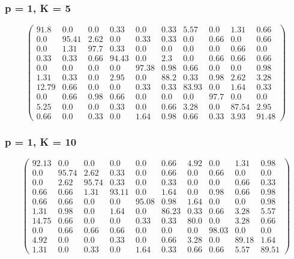 \begin{appendices}
\subsubsection*{p = 1, K = 5}
$$\begin{pmatrix}
91.8&0.0&0.0&0.33&0.0&0.33&5.57&0.0&1.31&0.66\\
0.0&95.41&2.62&0.0&0.33&0.33&0.0&0.66&0.0&0.66\\
0.0&1.31&97.7&0.33&0.0&0.0&0.0&0.0&0.66&0.0\\
0.33&0.33&0.66&94.43&0.0&2.3&0.0&0.66&0.66&0.66\\
0.0&0.0&0.0&0.0&97.38&0.98&0.66&0.0&0.0&0.98\\
1.31&0.33&0.0&2.95&0.0&88.2&0.33&0.98&2.62&3.28\\
12.79&0.66&0.0&0.0&0.33&0.33&83.93&0.0&1.64&0.33\\
0.0&0.66&0.98&0.66&0.0&0.0&0.0&97.7&0.0&0.0\\
5.25&0.0&0.0&0.33&0.0&0.66&3.28&0.0&87.54&2.95\\
0.66&0.0&0.33&0.0&1.64&0.98&0.66&0.33&3.93&91.48
\end{pmatrix}$$

\subsubsection*{p = 1, K = 10}
$$\begin{pmatrix}
92.13&0.0&0.0&0.0&0.0&0.66&4.92&0.0&1.31&0.98\\
0.0&95.74&2.62&0.33&0.0&0.66&0.0&0.66&0.0&0.0\\
0.0&2.62&95.74&0.33&0.0&0.33&0.0&0.0&0.66&0.33\\
0.66&0.66&1.31&93.11&0.0&1.64&0.0&0.98&0.66&0.98\\
0.66&0.66&0.0&0.0&95.08&0.98&1.64&0.0&0.0&0.98\\
1.31&0.98&0.0&1.64&0.0&86.23&0.33&0.66&3.28&5.57\\
14.75&0.66&0.0&0.0&0.33&0.33&80.0&0.0&3.28&0.66\\
0.0&0.66&0.66&0.66&0.0&0.0&0.0&98.03&0.0&0.0\\
4.92&0.0&0.0&0.33&0.0&0.66&3.28&0.0&89.18&1.64\\
1.31&0.0&0.33&0.0&1.64&0.33&0.66&0.66&5.57&89.51
\end{pmatrix}$$


\end{appendices}
